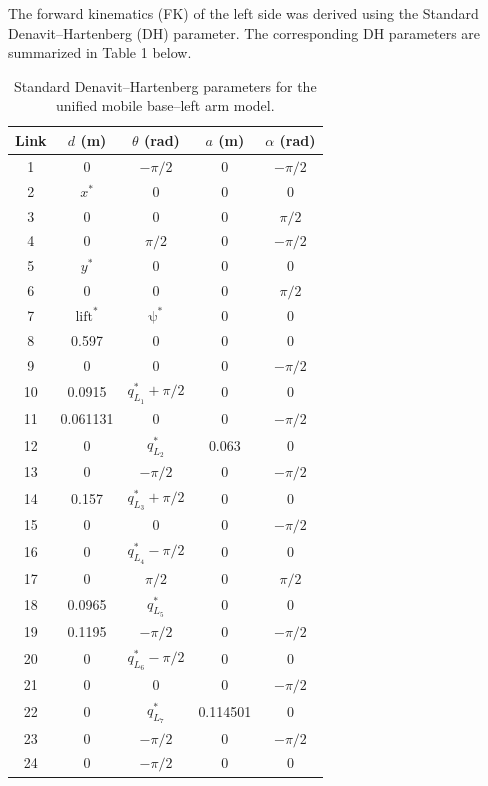 \documentclass[12pt,a4paper]{article}
\begin{document}
The forward kinematics (FK) of the left side was derived using the Standard Denavit–Hartenberg (DH) parameter. The corresponding DH parameters are summarized in Table 1 below. 

\begin{table}[htbp]
    \centering
    
    \begin{tabular}{c c c c c}
        \hline
        Link & $d$ (m) & $\theta$ (rad) & $a$ (m) & $\alpha$ (rad) \\
        \hline
        1  & 0 & $-\pi/2$ & 0 & $-\pi/2$ \\
        2  & $x^*$ & 0 & 0 & 0 \\
        3  & 0 & 0 & 0 & $\pi/2$ \\
        4  & 0 & $\pi/2$ & 0 & $-\pi/2$ \\
        5  & $y^*$ & 0 & 0 & 0 \\
        6  & 0 & 0 & 0 & $\pi/2$ \\
        7  & $\mathrm{lift}^*$ & $\mathrm{\psi }^*$ & 0 & 0 \\
        8  & 0.597 & 0 & 0 & 0 \\
        9  & 0 & 0 & 0 & $-\pi/2$ \\
        10 & 0.0915 & $q_{L_1}^*+\pi/2$ & 0 & 0 \\
        11 & 0.061131 & 0 & 0 & $-\pi/2$ \\
        12 & 0 & $q_{L_2}^*$ & 0.063 & 0 \\
        13 & 0 & $-\pi/2$ & 0 & $-\pi/2$ \\
        14 & 0.157 & $q_{L_3}^*+\pi/2$ & 0 & 0 \\
        15 & 0 & 0 & 0 & $-\pi/2$ \\
        16 & 0 & $q_{L_4}^*-\pi/2$ & 0 & 0 \\
        17 & 0 & $\pi/2$ & 0 & $\pi/2$ \\
        18 & 0.0965 & $q_{L_5}^*$ & 0 & 0 \\
        19 & 0.1195 & $-\pi/2$ & 0 & $-\pi/2$ \\
        20 & 0 & $q_{L_6}^*-\pi/2$ & 0 & 0 \\
        21 & 0 & 0 & 0 & $-\pi/2$ \\
        22 & 0 & $q_{L_7}^*$ & 0.114501 & 0 \\
        23 & 0 & $-\pi/2$ & 0 & $-\pi/2$ \\
        24 & 0 & $-\pi/2$ & 0 & 0 \\
        \hline
    \end{tabular}
    \caption{\small{Standard Denavit--Hartenberg parameters for the unified mobile base--left arm model.}}
    \label{tab:dh_parameters}
\end{table}
\end{document}
